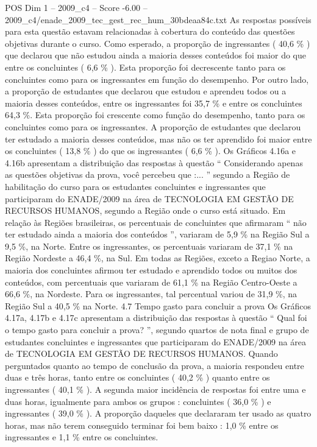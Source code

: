 \begin{textsample}{POS Dim 1 – 2009\_c4 – Score -6.00 – 2009\_c4/enade\_2009\_tec\_gest\_rec\_hum\_30bdeaa84c.txt}
As respostas possíveis para esta questão estavam relacionadas à cobertura do conteúdo das questões objetivas durante o curso.
Como esperado, a proporção de ingressantes ( 40,6 \% ) que declarou que não estudou ainda a maioria desses conteúdos foi maior do que entre os concluintes ( 6,6 \% ).
Esta proporção foi decrescente tanto para os concluintes como para os ingressantes em função do desempenho.
Por outro lado, a proporção de estudantes que declarou que estudou e aprendeu todos ou a maioria desses conteúdos, entre os ingressantes foi 35,7 \% e entre os concluintes 64,3 \%.
Esta proporção foi crescente como função do desempenho, tanto para os concluintes como para os ingressantes.
A proporção de estudantes que declarou ter estudado a maioria desses conteúdos, mas não os ter aprendido foi maior entre os concluintes ( 13,8 \% ) do que os ingressantes ( 6,6 \% ).
Os Gráficos 4.16a e 4.16b apresentam a distribuição das respostas à questão “ Considerando apenas as questões objetivas da prova, você percebeu que :... ” segundo a Região de habilitação do curso para os estudantes concluintes e ingressantes que participaram do ENADE/2009 na área de TECNOLOGIA EM GESTÃO DE RECURSOS HUMANOS, segundo a Região onde o curso está situado.
Em relação às Regiões brasileiras, os percentuais de concluintes que afirmaram “ não ter estudado ainda a maioria dos conteúdos ”, variaram de 5,9 \% na Região Sul a 9,5 \%, na Norte.
Entre os ingressantes, os percentuais variaram de 37,1 \% na Região Nordeste a 46,4 \%, na Sul.
Em todas as Regiões, exceto a Regiao Norte, a maioria dos concluintes afirmou ter estudado e aprendido todos ou muitos dos conteúdos, com percentuais que variaram de 61,1 \% na Região Centro-Oeste a 66,6 \%, na Nordeste.
Para os ingressantes, tal percentual variou de 31,9 \%, na Região Sul a 40,5 \% na Norte. 4.7 Tempo gasto para concluir a prova Os Gráficos 4.17a, 4.17b e 4.17c apresentam a distribuição das respostas à questão “ Qual foi o tempo gasto para concluir a prova? ”, segundo quartos de nota final e grupo de estudantes concluintes e ingressantes que participaram do ENADE/2009 na área de TECNOLOGIA EM GESTÃO DE RECURSOS HUMANOS.
Quando perguntados quanto ao tempo de conclusão da prova, a maioria respondeu entre duas e três horas, tanto entre os concluintes ( 40,2 \% ) quanto entre os ingressantes ( 40,1 \% ).
A segunda maior incidência de respostas foi entre uma e duas horas, igualmente para ambos os grupos : concluintes ( 36,0 \% ) e ingressantes ( 39,0 \% ).
A proporção daqueles que declararam ter usado as quatro horas, mas não terem conseguido terminar foi bem baixo : 1,0 \% entre os ingressantes e 1,1 \% entre os concluintes.

\end{textsample}
